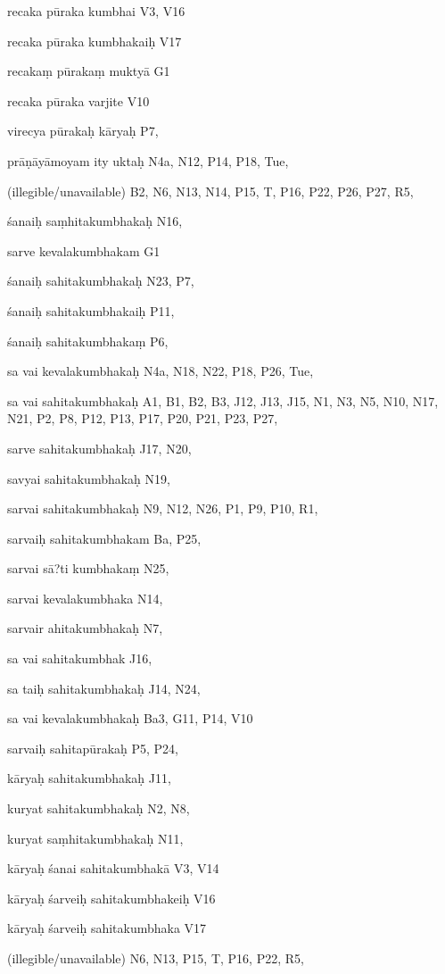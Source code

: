 \begin{ekdosis}
\begin{marma}[hp01_055]
\begin{marma}[hp02_009]
\begin{marma}[hp02_011]
\begin{marma}[hp02_73a]
\item[recaka pūraka kumbhai] V3, V16
\item[recaka pūraka kumbhakaiḥ] V17
\item[recakaṃ pūrakaṃ muktyā] G1
\item[recaka pūraka varjite] V10
\item[virecya pūrakaḥ kāryaḥ] P7,
\item[prāṇāyāmoyam ity uktaḥ] N4a, N12, P14, P18, Tue,
\item[(illegible/unavailable)] B2, N6, N13, N14, P15, T, P16, P22, P26, P27, R5,
  \begin{description}

    \end{description}
 \end{marma}

\begin{marma}[hp02_73b]
\item[śanaiḥ saṃhitakumbhakaḥ] N16, 
\item[sarve kevalakumbhakam] G1
\item[śanaiḥ sahitakumbhakaḥ] N23, P7, 
\item[śanaiḥ sahitakumbhakaiḥ] P11,
\item[śanaiḥ sahitakumbhakaṃ] P6, 
\item[sa vai kevalakumbhakaḥ] N4a, N18, N22, P18, P26, Tue, 
\item[sa vai sahitakumbhakaḥ] A1, B1, B2, B3, J12, J13, J15, N1, N3, N5, N10, N17, N21, P2, P8, P12, P13, P17, P20, P21, P23, P27, 
\item[sarve sahitakumbhakaḥ] J17, N20, 
\item[savyai sahitakumbhakaḥ] N19, 
\item[sarvai sahitakumbhakaḥ] N9, N12, N26, P1, P9, P10, R1, 
\item[sarvaiḥ sahitakumbhakam] Ba, P25,
\item[sarvai sā?ti kumbhakaṃ] N25,
\item[sarvai kevalakumbhaka] N14,
\item[sarvair ahitakumbhakaḥ] N7, 
\item[sa vai sahitakumbhak] J16, 
\item[sa taiḥ sahitakumbhakaḥ] J14, N24, 
\item[sa vai kevalakumbhakaḥ] Ba3, G11, P14, V10
\item[sarvaiḥ sahitapūrakaḥ] P5, P24, 
\item[kāryaḥ sahitakumbhakaḥ] J11,
\item[kuryat sahitakumbhakaḥ] N2, N8, 
\item[kuryat saṃhitakumbhakaḥ] N11, 
\item[kāryaḥ śanai sahitakumbhakā] V3, V14
\item[kāryaḥ śarveiḥ sahitakumbhakeiḥ] V16
\item[kāryaḥ śarveiḥ sahitakumbhaka] V17
\item[(illegible/unavailable)] N6, N13, P15, T, P16, P22, R5,
  \begin{description}


\end{description}
\end{marma}
\end{marma}
\end{marma}
\end{marma}
\end{ekdosis}

